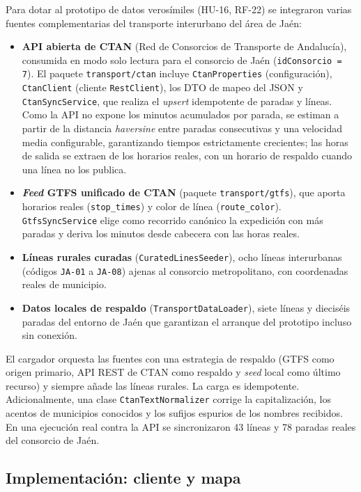 Para dotar al prototipo de datos verosímiles (HU-16, RF-22) se integraron varias fuentes complementarias del transporte interurbano del área de Jaén:

\begin{itemize}
  \item \textbf{API abierta de CTAN} (Red de Consorcios de Transporte de Andalucía), consumida en modo solo lectura para el consorcio de Jaén (\texttt{idConsorcio = 7}). El paquete \texttt{transport/ctan} incluye \texttt{CtanProperties} (configuración), \texttt{CtanClient} (cliente \texttt{RestClient}), los DTO de mapeo del JSON y \texttt{CtanSyncService}, que realiza el \textit{upsert} idempotente de paradas y líneas. Como la API no expone los minutos acumulados por parada, se estiman a partir de la distancia \textit{haversine} entre paradas consecutivas y una velocidad media configurable, garantizando tiempos estrictamente crecientes; las horas de salida se extraen de los horarios reales, con un horario de respaldo cuando una línea no los publica.
  \item \textbf{\textit{Feed} GTFS unificado de CTAN} (paquete \texttt{transport/gtfs}), que aporta horarios reales (\texttt{stop\_times}) y color de línea (\texttt{route\_color}). \texttt{GtfsSyncService} elige como recorrido canónico la expedición con más paradas y deriva los minutos desde cabecera con las horas reales.
  \item \textbf{Líneas rurales curadas} (\texttt{CuratedLinesSeeder}), ocho líneas interurbanas (códigos \texttt{JA-01} a \texttt{JA-08}) ajenas al consorcio metropolitano, con coordenadas reales de municipio.
  \item \textbf{Datos locales de respaldo} (\texttt{TransportDataLoader}), siete líneas y dieciséis paradas del entorno de Jaén que garantizan el arranque del prototipo incluso sin conexión.
\end{itemize}

El cargador orquesta las fuentes con una estrategia de respaldo (GTFS como origen primario, API REST de CTAN como respaldo y \textit{seed} local como último recurso) y siempre añade las líneas rurales. La carga es idempotente. Adicionalmente, una clase \texttt{CtanTextNormalizer} corrige la capitalización, los acentos de municipios conocidos y los sufijos espurios de los nombres recibidos. En una ejecución real contra la API se sincronizaron 43 líneas y 78 paradas reales del consorcio de Jaén.

\subsection{Implementación: cliente y mapa}

